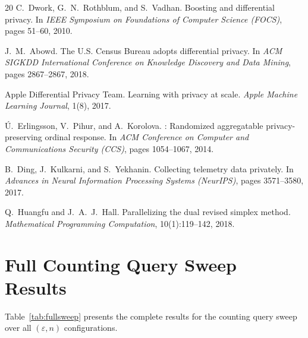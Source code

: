 \documentclass[11pt,a4paper]{article}
\newcommand{\eps}{\varepsilon}
\begin{document}
\begin{thebibliography}{20}
C.~Dwork, G.~N.~Rothblum, and S.~Vadhan.
\newblock Boosting and differential privacy.
\newblock In \emph{IEEE Symposium on Foundations of Computer Science (FOCS)},
  pages 51--60, 2010.

J.~M.~Abowd.
\newblock The {U.S.} {C}ensus {B}ureau adopts differential privacy.
\newblock In \emph{ACM SIGKDD International Conference on Knowledge Discovery
  and Data Mining}, pages 2867--2867, 2018.

{Apple Differential Privacy Team}.
\newblock Learning with privacy at scale.
\newblock \emph{Apple Machine Learning Journal}, 1(8), 2017.

\'U.~Erlingsson, V.~Pihur, and A.~Korolova.
: Randomized aggregatable privacy-preserving ordinal response.
\newblock In \emph{ACM Conference on Computer and Communications Security (CCS)},
  pages 1054--1067, 2014.

B.~Ding, J.~Kulkarni, and S.~Yekhanin.
\newblock Collecting telemetry data privately.
\newblock In \emph{Advances in Neural Information Processing Systems (NeurIPS)},
  pages 3571--3580, 2017.

Q.~Huangfu and J.~A.~J.~Hall.
\newblock Parallelizing the dual revised simplex method.
\newblock \emph{Mathematical Programming Computation}, 10(1):119--142, 2018.

\end{thebibliography}


\appendix

\section{Full Counting Query Sweep Results}
\label{app:fullsweep}

Table~\ref{tab:fullsweep} presents the complete results for the counting query
sweep over all $(\eps, n)$ configurations.
\end{document}
